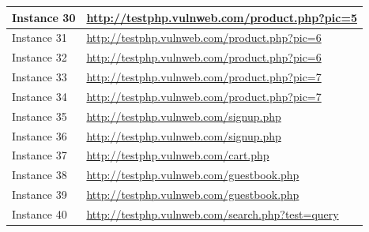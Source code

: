 \documentclass[12pt]{article}
\begin{document}
\begin{center}
\begin{longtable}{|l|p{10cm}|}
\hline
Instance 30 & \url{http://testphp.vulnweb.com/product.php?pic=5} \\
\hline
Instance 31 & \url{http://testphp.vulnweb.com/product.php?pic=6} \\
\hline
Instance 32 & \url{http://testphp.vulnweb.com/product.php?pic=6} \\
\hline
Instance 33 & \url{http://testphp.vulnweb.com/product.php?pic=7} \\
\hline
Instance 34 & \url{http://testphp.vulnweb.com/product.php?pic=7} \\
\hline
Instance 35 & \url{http://testphp.vulnweb.com/signup.php} \\
\hline
Instance 36 & \url{http://testphp.vulnweb.com/signup.php} \\
\hline
Instance 37 & \url{http://testphp.vulnweb.com/cart.php} \\
\hline
Instance 38 & \url{http://testphp.vulnweb.com/guestbook.php} \\
\hline
Instance 39 & \url{http://testphp.vulnweb.com/guestbook.php} \\
\hline
Instance 40 & \url{http://testphp.vulnweb.com/search.php?test=query} \\
\hline
\end{longtable}
\end{center}\vspace{0.7cm}
\end{document}
